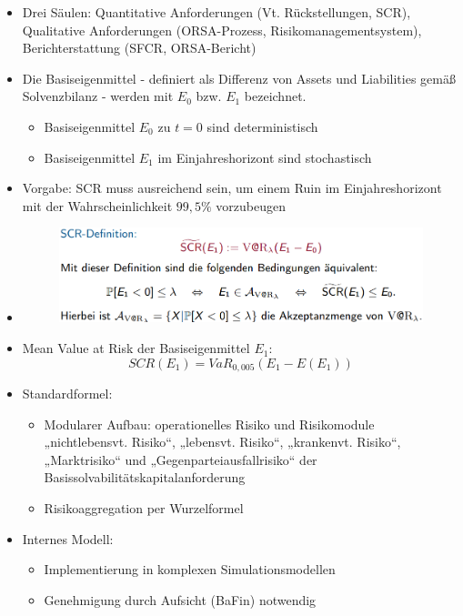 \documentclass[12pt]{report}
\theoremstyle{dotless}
\theoremstyle{definition}
\begin{document}
\begin{itemize}
\item Drei Säulen: Quantitative Anforderungen (Vt. Rückstellungen, SCR), Qualitative Anforderungen (ORSA-Prozess, Risikomanagementsystem), Berichterstattung (SFCR, ORSA-Bericht)
\item Die Basiseigenmittel - definiert als Differenz von Assets und Liabilities gemäß
Solvenzbilanz - werden mit $E_0$ bzw. $E_1$ bezeichnet.
\begin{itemize}
\item Basiseigenmittel $E_0$ zu $t = 0$ sind deterministisch
\item Basiseigenmittel $E_1$ im Einjahreshorizont sind stochastisch
\end{itemize}
\item Vorgabe: SCR muss ausreichend sein, um einem Ruin im Einjahreshorizont mit der
Wahrscheinlichkeit $99,5 \%$ vorzubeugen
\item \begin{figure}[ht]
	\centering
	\includegraphics[width=0.9 \textwidth]{Bilder/SCR.png}
\end{figure}
\item Mean Value at Risk der Basiseigenmittel $E_1$:
\begin{equation}
SCR(E_1) = VaR_{0,005}(E_1- E(E_1))
\end{equation}
\item Standardformel:
\begin{itemize}
\item Modularer Aufbau: operationelles Risiko und
Risikomodule „nichtlebensvt. Risiko“, „lebensvt.
Risiko“, „krankenvt. Risiko“, „Marktrisiko“ und
„Gegenparteiausfallrisiko“ der
Basissolvabilitätskapitalanforderung 
\item Risikoaggregation per Wurzelformel
\end{itemize}
\item Internes Modell:
\begin{itemize}
\item Implementierung in komplexen Simulationsmodellen
\item Genehmigung durch Aufsicht (BaFin) notwendig
\end{itemize}
\end{itemize}
\end{document}
